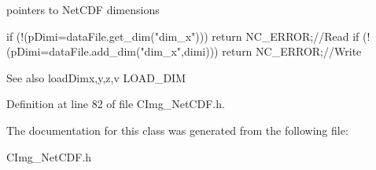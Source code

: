 pointers to NetCDF dimensions 
\begin{DoxyCode}
   if (!(pDimi=dataFile.get_dim("dim_x"))) return NC_ERROR;//Read
   if (!(pDimi=dataFile.add_dim("dim_x",dimi))) return NC_ERROR;//Write
\end{DoxyCode}


\begin{DoxySeeAlso}{See also}
loadDimx,y,z,v LOAD\_\-DIM 
\end{DoxySeeAlso}


Definition at line 82 of file CImg\_\-NetCDF.h.

The documentation for this class was generated from the following file:\begin{DoxyCompactItemize}
\item 
CImg\_\-NetCDF.h\end{DoxyCompactItemize}
